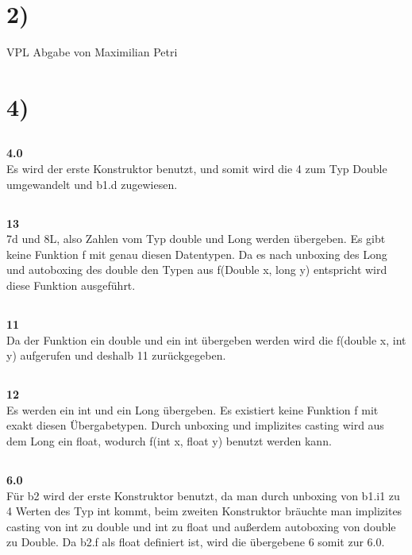 \documentclass[12pt]{article}
\date{}
\begin{document}
\section{2)}
\begin{center}
    VPL Abgabe von Maximilian Petri
\end{center}

\section{4)}
\begin{center}

\subsection{}
\textbf{4.0}\\
Es wird der erste Konstruktor benutzt, und somit wird die 4 zum Typ Double umgewandelt und b1.d zugewiesen.

\subsection{}
\textbf{13}\\
7d und 8L, also Zahlen vom Typ double und Long werden übergeben. Es gibt keine Funktion f mit genau diesen Datentypen. Da es nach unboxing des Long und autoboxing des double den Typen aus f(Double x, long y) entspricht wird diese Funktion ausgeführt.

\subsection{}
\textbf{11}\\
Da der Funktion ein double und ein int übergeben werden wird die f(double x, int y) aufgerufen und deshalb 11 zurückgegeben.

\subsection{}
\textbf{12}\\
Es werden ein int und ein Long übergeben. Es existiert keine Funktion f mit exakt diesen Übergabetypen. Durch unboxing und implizites casting wird aus dem Long ein float, wodurch f(int x, float y) benutzt werden kann. 

\subsection{}
\textbf{6.0}\\
Für b2 wird der erste Konstruktor benutzt, da man durch unboxing von b1.i1 zu 4 Werten des Typ int kommt, beim zweiten Konstruktor bräuchte man implizites casting von int zu double und int zu float und außerdem autoboxing von double zu Double.
Da b2.f als float definiert ist, wird die übergebene 6 somit zur 6.0.


\end{center}
\end{document}
